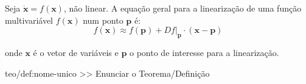 {

\begin{mdframed}
    \noindent Seja $\pmb{\dot{x}} = f(\pmb{x})$, não linear. A equação geral para a linearização de uma função multivariável $f(\pmb{x})$ num ponto $\pmb{p}$ é:
    \vspace{-0.5em}
    $$
        f(\pmb{x}) \approx f(\pmb{p}) + \left.D f\right|_{\pmb{p}} \cdot (\pmb{x} - \pmb{p})
    $$
    
    \noindent onde $\pmb{x}$ é o vetor de variáveis e $\pmb{p}$ o ponto de interesse para a linearização.
\end{mdframed}
}

\begin{theo}{teo/def:nome-unico}\label{teo/def:nome-unico}
    >> Enunciar o Teorema/Definição
\end{theo}

\renewcommand*{\thefootnote}{\fnsymbol{footnote}}
\renewcommand*{\thefootnote}{\arabic{footnote}}